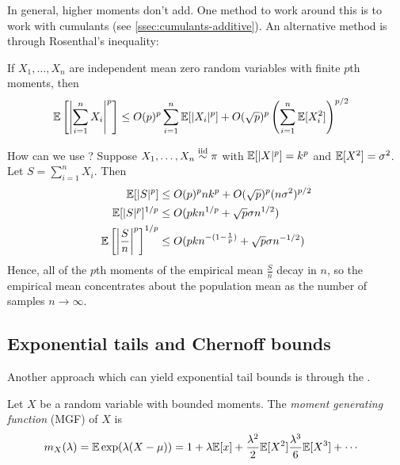 In general, higher moments don't add.
One method to work around this is to work with cumulants (see \cref{ssec:cumulants-additive}).
An alternative method is through Rosenthal's inequality:

\begin{lemma}\label{lem:rosenthal-ineq}
    If $X_1,\ldots, X_n$ are independent mean zero random variables with finite $p$th moments, then
    \begin{align}
        \mathbb{E}\left[\left\lvert \sum_{i=1}^n X_i \right\rvert^p\right]
        &\leq O(p)^p \sum_{i=1}^n \mathbb{E}[\lvert X_i \rvert^p]
        + O(\sqrt{p})^p \left( \sum_{i=1}^n \mathbb{E}[X_i^2] \right)^{p/2}
    \end{align}
\end{lemma}

How can we use ?
Suppose $X_1, \ldots, X_n \overset{\text{iid}}{\sim} \pi$ with $\mathbb{E}[\lvert X \rvert^p] = k^p$
and $\mathbb{E}[X^2] = \sigma^2$. Let $S = \sum_{i=1}^n X_i$.
Then
\begin{align}
    \mathbb{E}[\lvert S \rvert^p ] &\leq O(p)^p n k^p + O(\sqrt{p})^p (n \sigma^2)^{p/2} \\
    \mathbb{E}[\lvert S \rvert^p]^{1/p} &\leq O(p k n^{1/p} + \sqrt{p} \sigma n^{1/2}) \\
    \mathbb{E}\left[ \left\lvert \frac{S}{n} \right\rvert^p \right]^{1/p}
    &\leq O(p k n^{-(1-\frac{1}{p})} + \sqrt{p} \sigma n^{-1/2})
\end{align}
Hence, all of the $p$th moments of the empirical mean $\frac{S}{n}$ decay in $n$,
so the empirical mean concentrates about the population mean as the number of samples $n \to \infty$.

\subsection{Exponential tails and Chernoff bounds}

Another approach which can yield exponential tail bounds is through the .
\begin{definition}\label{def:moment-generating-function}
    Let $X$ be a random variable with bounded moments.
    The \emph{moment generating function} (MGF) of $X$ is
    \begin{align}
        m_X(\lambda)
        &= \mathbb{E} \exp(\lambda (X - \mu))
        = 1 + \lambda \mathbb{E}[x] + \frac{\lambda^2}{2} \mathbb{E}[X^2]  \frac{\lambda^3}{6} \mathbb{E}[X^3] + \cdots
    \end{align}
\end{definition}

